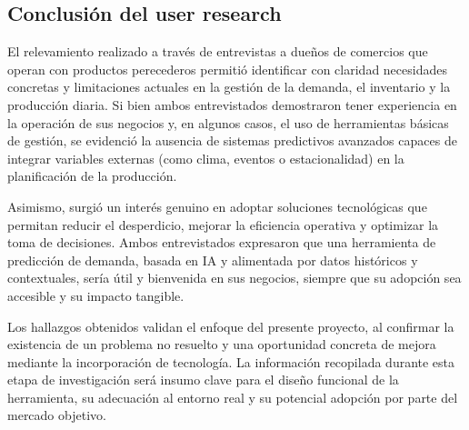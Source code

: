 \subsection{Conclusión del user research}

\indent El relevamiento realizado a través de entrevistas a dueños de comercios que operan con productos perecederos permitió identificar con claridad necesidades concretas y limitaciones actuales en la gestión de la demanda, el inventario y la producción diaria. Si bien ambos entrevistados demostraron tener experiencia en la operación de sus negocios y, en algunos casos, el uso de herramientas básicas de gestión, se evidenció la ausencia de sistemas predictivos avanzados capaces de integrar variables externas (como clima, eventos o estacionalidad) en la planificación de la producción.

\indent Asimismo, surgió un interés genuino en adoptar soluciones tecnológicas que permitan reducir el desperdicio, mejorar la eficiencia operativa y optimizar la toma de decisiones. Ambos entrevistados expresaron que una herramienta de predicción de demanda, basada en IA y alimentada por datos históricos y contextuales, sería útil y bienvenida en sus negocios, siempre que su adopción sea accesible y su impacto tangible.

\indent Los hallazgos obtenidos validan el enfoque del presente proyecto, al confirmar la existencia de un problema no resuelto y una oportunidad concreta de mejora mediante la incorporación de tecnología. La información recopilada durante esta etapa de investigación será insumo clave para el diseño funcional de la herramienta, su adecuación al entorno real y su potencial adopción por parte del mercado objetivo.





